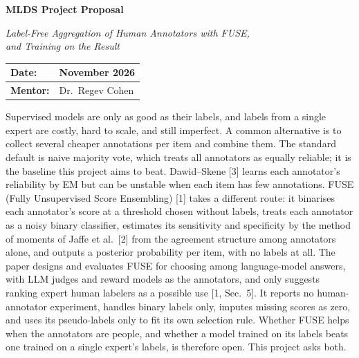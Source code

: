 \documentclass[10pt]{article}
\newcommand{\secrule}[1]{\par\vspace{8pt}{\noindent\color{navy}\bfseries\fontsize{14}{16}\selectfont #1\par}\vspace{-5pt}{\color{navy}\rule{\linewidth}{0.7pt}}\par\vspace{1pt}}
\begin{document}
\begin{center}
{\color{navy}\bfseries\fontsize{18}{21}\selectfont MLDS Project Proposal\par}
\vspace{2pt}
{\itshape\fontsize{13}{16}\selectfont Label-Free Aggregation of Human Annotators with FUSE,\\and Training on the Result\par}
\end{center}
\vspace{-2pt}

\renewcommand{\arraystretch}{1.3}
{\setlength{\parskip}{0pt}\noindent\begin{tabular}{|>{\columncolor{tblfill}\color{navy}\bfseries}m{82pt}|m{\dimexpr\linewidth-82pt-6\tabcolsep-2\arrayrulewidth\relax}|}
\hline
Date: & November 2026 \\ \hline
Mentor: & Dr.\ Regev Cohen \\ \hline
\end{tabular}}

\secrule{Background}

Supervised models are only as good as their labels, and labels from a single expert are costly, hard to scale, and still imperfect. A common alternative is to collect several cheaper annotations per item and combine them. The standard default is naive majority vote, which treats all annotators as equally reliable; it is the baseline this project aims to beat. Dawid--Skene [3] learns each annotator's reliability by EM but can be unstable when each item has few annotations. FUSE (Fully Unsupervised Score Ensembling) [1] takes a different route: it binarises each annotator's score at a threshold chosen without labels, treats each annotator as a noisy binary classifier, estimates its sensitivity and specificity by the method of moments of Jaffe et al.\ [2] from the agreement structure among annotators alone, and outputs a posterior probability per item, with no labels at all. The paper designs and evaluates FUSE for choosing among language-model answers, with LLM judges and reward models as the annotators, and only suggests ranking expert human labelers as a possible use [1, Sec.~5]. It reports no human-annotator experiment, handles binary labels only, imputes missing scores as zero, and uses its pseudo-labels only to fit its own selection rule. Whether FUSE helps when the annotators are people, and whether a model trained on its labels beats one trained on a single expert's labels, is therefore open. This project asks both.
\end{document}

